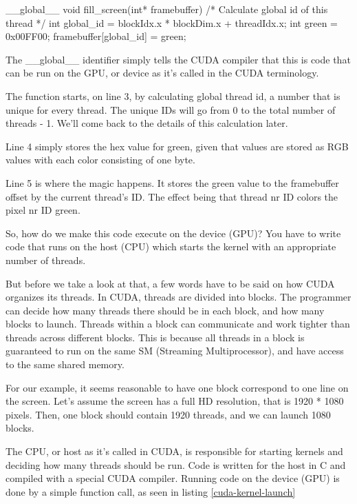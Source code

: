 \documentclass[../main/report.tex]{subfiles}
\begin{document}
\begin{c-code}[caption=A CUDA kernel filling a single pixel with green, label=lst:green-kernel]
__global__ void fill_screen(int* framebuffer){
	/* Calculate global id of this thread */
	int global_id = blockIdx.x * blockDim.x + threadIdx.x; 
	int green     = 0x00FF00;
	framebuffer[global_id] = green;
}
\end{c-code}

The \_\_global\_\_ identifier simply tells the CUDA compiler that this is code that can be run on the GPU, or device as it's called in the CUDA terminology.

The function starts, on line 3, by calculating global thread id, a number that is unique for every thread. 
The unique IDs will go from 0 to the total number of threads - 1.
We'll come back to the details of this calculation later. 

Line 4 simply stores the hex value for green,
given that values are stored as RGB values with each color consisting of one byte.

Line 5 is where the magic happens.
It stores the green value to the framebuffer offset by the current thread's ID.
The effect being that thread nr ID colors the pixel nr ID green.

So, how do we make this code execute on the device (GPU)?
You have to write code that runs on the host (CPU) which starts the kernel with an appropriate number of threads.

But before we take a look at that, a few words have to be said on how CUDA organizes its threads.
In CUDA, threads are divided into blocks.
The programmer can decide how many threads there should be in each block, and how many blocks to launch.
Threads within a block can communicate and work tighter than threads across different blocks.
This is because all threads in a block is guaranteed to run on the same SM (Streaming Multiprocessor), and have access to the same shared memory.

For our example, it seems reasonable to have one block correspond to one line on the screen.
Let's assume the screen has a full HD resolution, that is 1920 * 1080 pixels.
Then, one block should contain 1920 threads, and we can launch 1080 blocks.

The CPU, or host as it's called in CUDA, is responsible for starting kernels and deciding how many threads should be run.
Code is written for the host in C and compiled with a special CUDA compiler.
Running code on the device (GPU) is done by a simple function call, as seen in listing \ref{cuda-kernel-launch}
\end{document}
